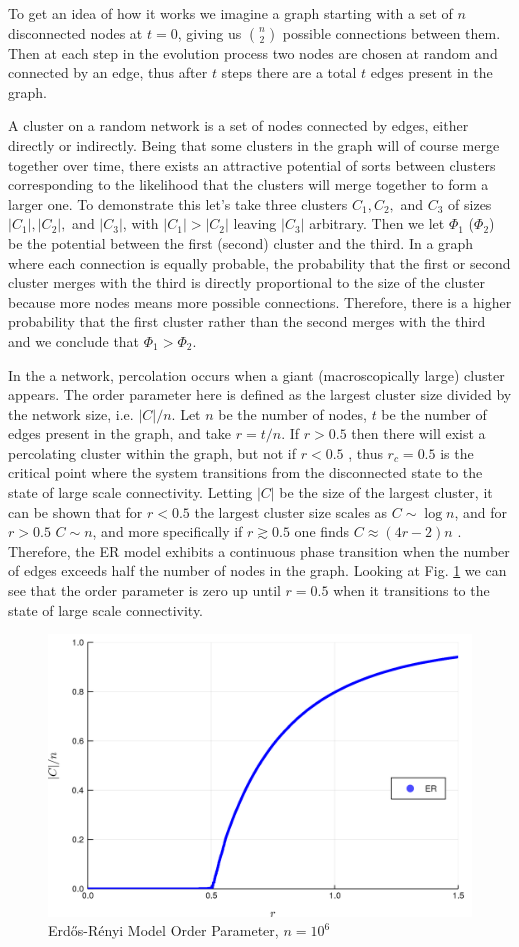 To get an idea of how it works we imagine a graph starting with a set of $n$ disconnected nodes at $t = 0$, giving us ${n \choose 2}$ possible connections between them.
Then at each step in the evolution process two nodes are chosen at random and connected by an edge, thus after $t$ steps there are a total $t$ edges present in the graph.

A cluster on a random network is a set of nodes connected by edges, either directly or indirectly.
Being that some clusters in the graph will of course merge together over time, there exists an attractive potential of sorts between clusters corresponding to the likelihood that the clusters will merge together to form a larger one.
To demonstrate this let's take three clusters $C_1, C_2,$ and $C_3$ of sizes $|C_1|, |C_2|,$ and $|C_3|$, with $|C_1| > |C_2|$ leaving $|C_3|$ arbitrary.
Then we let $\Phi_1$ ($\Phi_2$) be the potential between the first (second) cluster and the third.
In a graph where each connection is equally probable, the probability that the first or second cluster merges with the third is directly proportional to the size of the cluster because more nodes means more possible connections.
Therefore, there is a higher probability that the first cluster rather than the second merges with the third and we conclude that $\Phi_1 > \Phi_2$.

In the a network, percolation occurs when a giant (macroscopically large) cluster appears.
The order parameter here is defined as the largest cluster size divided by the network size, i.e. $|C| / n$.
Let $n$ be the number of nodes, $t$ be the number of edges present in the graph, and take $r = t/n$.
If $r > 0.5$ then there will exist a percolating cluster within the graph, but not if $r < 0.5$ \cite{ER2}, thus $r_c = 0.5$ is the critical point where the system transitions from the disconnected state to the state of large scale connectivity.
Letting $|C|$ be the size of the largest cluster, it can be shown that for $r < 0.5$ the largest cluster size scales as $C \sim \log n$, and for $r > 0.5$ $C \sim n$, and more specifically if $r \gtrsim 0.5$ one finds $C \approx (4r - 2)n$ \cite{ER2}.
Therefore, the ER model exhibits a continuous phase transition when the number of edges exceeds half the number of nodes in the graph.
Looking at Fig. \ref{fig:ER_transition} we can see that the order parameter is zero up until $r = 0.5$ when it transitions to the state of large scale connectivity.

\begin{figure}[H]
	\centering
	\includegraphics[width=350pt]{images/ER_1e6_order_param.png}
	\caption{Erdős-Rényi Model Order Parameter, $n = 10^6$}
	\label{fig:ER_transition}
\end{figure}
